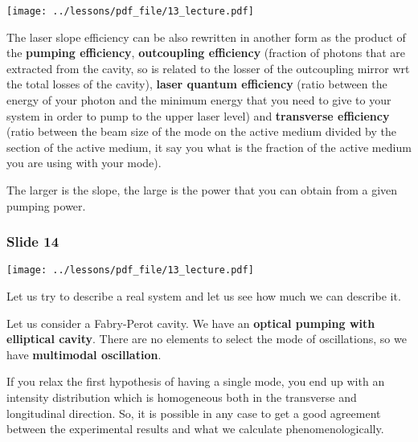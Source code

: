 \documentclass[../main/main.tex]{subfiles}
\begin{document}
\begin{minipage}[]{0.5\linewidth}
\centering
\texttt{[image: ../lessons/pdf\_file/13\_lecture.pdf]}
\end{minipage}
\hspace{0.3cm}\vspace{0.3cm}
\begin{minipage}[c]{0.47\linewidth}

The laser slope efficiency can be also rewritten in another form as the product of the \textbf{pumping efficiency},  \textbf{outcoupling efficiency} (fraction of photons that are extracted from the cavity, so is related to the losser of the outcoupling mirror wrt the total losses of the cavity), \textbf{laser quantum efficiency} (ratio between the energy of your photon and the minimum energy that you need to give to your system in order to pump to the upper laser level) and \textbf{transverse efficiency} (ratio between the beam size of the mode on the active medium divided by the section of the active medium, it say you what is the fraction of the active medium you are using with your mode).

The larger is the slope, the large is the power that you can obtain from a given pumping power.

\end{minipage}

\subsubsection*{Slide 14}

\begin{minipage}[]{0.5\linewidth}
\centering
\texttt{[image: ../lessons/pdf\_file/13\_lecture.pdf]}
\end{minipage}
\hspace{0.3cm}\vspace{0.3cm}
\begin{minipage}[c]{0.47\linewidth}

Let us try to describe a real system and let us see how much we can describe it.

Let us consider a Fabry-Perot cavity. We have an \textbf{optical pumping with elliptical cavity}.
There are no elements to select the mode of oscillations, so we have \textbf{multimodal oscillation}.

If you relax the first hypothesis of having a single mode, you end up with an intensity distribution which is homogeneous both in the transverse and longitudinal direction. So, it is possible in any case to get a good agreement between the experimental results and what we calculate phenomenologically.

\end{minipage}
\end{document}
